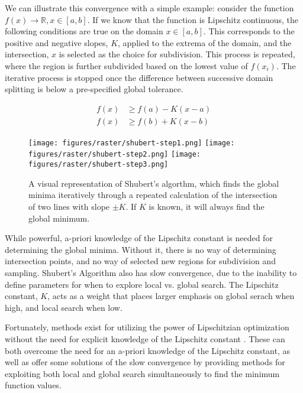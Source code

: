 We can illustrate this convergence with a simple example: consider the function $f(x) \rightarrow \mathbb{R}, x \in [a,b]$. If we know that the function is Lipschitz continuous, the following conditions are true on the domain $x\in[a,b]$. This corresponds to the positive and negative slopes, $K$, applied to the extrema of the domain, and the intersection, $x$ is selected as the choice for subdivision. This process is repeated, where the region is further subdivided based on the lowest value of $f(x_i)$. The iterative process is stopped once the difference between successive domain splitting is below a pre-specified global tolerance. 

\begin{equation}
    \begin{aligned}
        f(x) &\ge f(a) - K(x - a) \\
        f(x) &\ge f(b) + K(x - b)
    \end{aligned}
    \label{eq:shubert}
\end{equation}

\begin{figure}
    \begin{center}
        \texttt{[image: figures/raster/shubert-step1.png]}
        \vspace{3mm}
        \texttt{[image: figures/raster/shubert-step2.png]}
        \vspace{3mm}
        \texttt{[image: figures/raster/shubert-step3.png]}
    \end{center}
    \label{fig:shubert}
    \caption{A visual representation of Shubert's algorthm, which finds the global minima iteratively through a repeated calculation of the intersection of two lines with slope $\pm K$. If $K$ is known, it will always find the global minimum.}
\end{figure}

While powerful, a-priori knowledge of the Lipschitz constant is needed for determining the global minima. Without it, there is no way of determining intersection points, and no way of selected new regions for subdivision and sampling. Shubert's Algorithm also has slow convergence, due to the inability to define parameters for when to explore local vs. global search. The Lipschitz constant, $K$, acts as a weight that places larger emphasis on global serach when high, and local search when low.

Fortunately, methods exist for utilizing the power of Lipschitzian optimization without the need for explicit knowledge of the Lipschitz constant \cite{jonesLipschitzianOptimizationLipschitz1993}. These can both overcome the need for an a-priori knowledge of the Lipschitz constant, as well as offer some solutions of the slow convergence by providing methods for exploiting both local and global search simultaneously to find the minimum function values.

